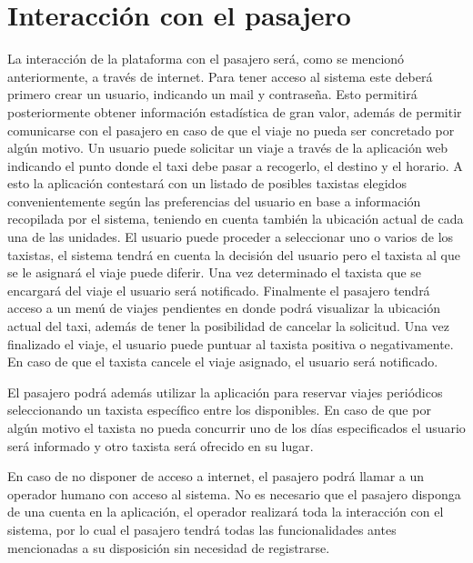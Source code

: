 \section{Interacción con el pasajero}
La interacción de la plataforma con el pasajero será, como se mencionó anteriormente, a través de internet. Para tener acceso al sistema este deberá primero crear un usuario, indicando un mail y contraseña. Esto permitirá posteriormente obtener información estadística de gran valor, además de permitir comunicarse con el pasajero en caso de que el viaje no pueda ser concretado por algún motivo. Un usuario puede solicitar un viaje a través de la aplicación web indicando el punto donde el taxi debe pasar a recogerlo, el destino y el horario. A esto la aplicación contestará con un listado de posibles taxistas elegidos convenientemente según las preferencias del usuario en base a información recopilada por el sistema, teniendo en cuenta también la ubicación actual de cada una de las unidades. El usuario puede proceder a seleccionar uno o varios de los taxistas, el sistema tendrá en cuenta la decisión del usuario pero el taxista al que se le asignará el viaje puede diferir. Una vez determinado el taxista que se encargará del viaje el usuario será notificado. Finalmente el pasajero tendrá acceso a un menú de viajes pendientes en donde podrá visualizar la ubicación actual del taxi, además de tener la posibilidad de cancelar la solicitud. Una vez finalizado el viaje, el usuario puede puntuar al taxista positiva o negativamente. En caso de que el taxista cancele el viaje asignado, el usuario será notificado.

El pasajero podrá además utilizar la aplicación para reservar viajes periódicos seleccionando un taxista específico entre los disponibles. En caso de que por algún motivo el taxista no pueda concurrir uno de los días especificados el usuario será informado y otro taxista será ofrecido en su lugar.

En caso de no disponer de acceso a internet, el pasajero podrá llamar a un operador humano con acceso al sistema. No es necesario que el pasajero disponga de una cuenta en la aplicación, el operador realizará toda la interacción con el sistema, por lo cual el pasajero tendrá todas las funcionalidades antes mencionadas a su disposición sin necesidad de registrarse.

